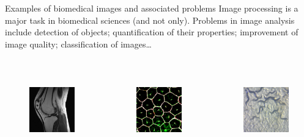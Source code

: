 \documentclass[9pt, aspectratio=169]{beamer}
\begin{document}
\begin{frame}
    {Examples of biomedical images and associated problems}
    Image processing is a major task in biomedical sciences (and not only).
    Problems in image analysis include detection of objects; quantification of their properties; improvement of image quality; classification of images\dots

    \begin{columns}
        \begin{column}{0.25\textwidth}
            \begin{figure}
                \includegraphics[height=10em]{MRI - Becky Stern CC-BY-SA2.jpg}
                \caption{\color{gray}{Becky Stern - CC-BY-SA 2.0}}
            \end{figure}
        \end{column}
        \begin{column}{0.25\textwidth}
            \begin{figure}
                \includegraphics[height=10em]{Retinal pigment epithelium - NIH - CC BY-NC 2.0.jpg}
                \caption{\color{gray}{NIH - CC-BY-SA 2.0}}
            \end{figure}
        \end{column}
        \begin{column}{0.25\textwidth}
            \begin{figure}
                \includegraphics[height=10em]{c elegans - Zeiss - CC-BY 2.0.jpg}

\end{figure}
\end{column}
\end{columns}
\end{frame}
\end{document}
